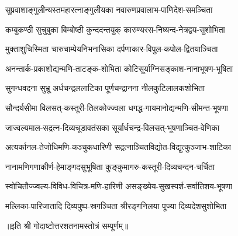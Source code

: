 \twolineshloka
{सुप्रवाशाङ्गुलीन्यस्तमहारत्नाङ्गुलीयका}
{नवारुणप्रवालाभ-पाणिदेश-समञ्चिता}

\twolineshloka
{कम्बुकण्ठी  सुचुबुका  बिम्बोष्ठी  कुन्ददन्तयुक्}
{कारुण्यरस-निष्यन्द-नेत्रद्वय-सुशोभिता}


\twolineshloka
{मुक्ताशुचिस्मिता  चारुचाम्पेयनिभनासिका}
{दर्पणाकार-विपुल-कपोल-द्वितयाञ्चिता}


\twolineshloka
{अनन्तार्क-प्रकाशोद्यन्मणि-ताटङ्क-शोभिता}
{कोटिसूर्याग्निसङ्काश-नानाभूषण-भूषिता}


\twolineshloka
{सुगन्धवदना  सुभ्रू  अर्धचन्द्रललाटिका}
{पूर्णचन्द्रानना  नीलकुटिलालकशोभिता}


\twolineshloka
{सौन्दर्यसीमा  विलसत्-कस्तूरी-तिलकोज्ज्वला}
{धगद्ध-गायमानोद्यन्मणि-सीमन्त-भूषणा}


\twolineshloka
{जाज्वल्यमाल-सद्रत्न-दिव्यचूडावतंसका}
{सूर्यार्धचन्द्र-विलसत्-भूषणाञ्चित-वेणिका}


\twolineshloka
{अत्यर्कानल-तेजोधिमणि-कञ्चुकधारिणी}
{सद्रत्नाञ्चितविद्योत-विद्युत्कुञ्जाभ-शाटिका}

\twolineshloka
{नानामणिगणाकीर्ण-हेमाङ्गदसुभूषिता}
{कुङ्कुमागरु-कस्तूरी-दिव्यचन्दन-चर्चिता}

\twolineshloka
{स्वोचितौज्ज्वल्य-विविध-विचित्र-मणि-हारिणी}
{असङ्ख्येय-सुखस्पर्श-सर्वातिशय-भूषणा}

\twolineshloka
{मल्लिका-पारिजातादि  दिव्यपुष्प-स्रगञ्चिता}
{श्रीरङ्गनिलया  पूज्या  दिव्यदेशसुशोभिता}

{॥इति श्री गोदाष्टोत्तरशतनामस्तोत्रं सम्पूर्णम्॥}
